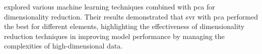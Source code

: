 \citet{rezaei_dimensionality_reduction} explored various machine learning techniques combined with \gls{pca} for dimensionality reduction. Their results demonstrated that \gls{svr} with \gls{pca} performed the best for different elements, highlighting the effectiveness of dimensionality reduction techniques in improving model performance by managing the complexities of high-dimensional data.




